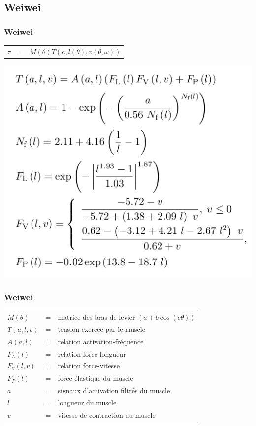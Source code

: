 \documentclass{beamer}
\begin{document}

\subsection{Weiwei}

\begin{frame}
\frametitle{Weiwei}
\begin{tabular}{lcl}
    $\tau$ & = & $M(\theta) T(a, l(\theta), v(\theta, \omega))$ \\
\end{tabular}
\begin{center}
        \includegraphics[width=.60\linewidth]{fig/weiwei}
\end{center}
\end{frame}

\begin{frame}
\frametitle{Weiwei}
\begin{tabular}{lcl}
    $M(\theta)$  & = & matrice des bras de levier $(a + b \cos (c \theta))$ \\
    $T(a, l, v)$ & = & tension exercée par le muscle \\
    $A(a, l)$    & = & relation activation-fréquence \\
    $F_L(l)$     & = & relation force-longueur \\
    $F_V(l, v)$  & = & relation force-vitesse \\
    $F_P(l)$     & = & force élastique du muscle \\ %
    $a$          & = & signaux d'activation filtrés du muscle \\
    $l$          & = & longueur du muscle \\
    $v$          & = & vitesse de contraction du muscle \\
\end{tabular}
\end{frame}
\end{document}
